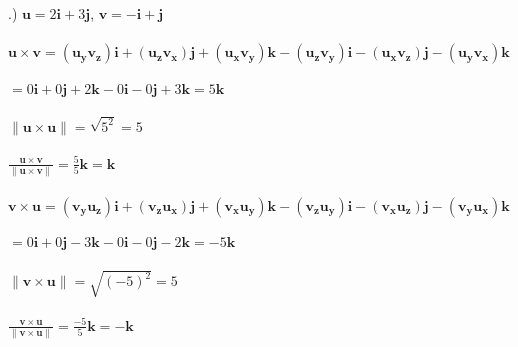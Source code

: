 \documentclass[12pt]{article}
\begin{document}
.) $\mathbf{u} = 2\mathbf{i} + 3\mathbf{j}$, \hspace{10pt} $\mathbf{v} = -\mathbf{i} + \mathbf{j}$\\\\
$\mathbf{u \times v } = (\mathbf{u_{y}v_{z}})\mathbf{i} + (\mathbf{u_{z}v_{x}})\mathbf{j} + (\mathbf{u_{x}v_{y}})\mathbf{k} -(\mathbf{u_{z}v_{y}})\mathbf{i} - (\mathbf{u_{x}v_{z}})\mathbf{j}-(\mathbf{u_{y}v_{x}})\mathbf{k}$\\\\
$=0\mathbf{i} + 0\mathbf{j} + 2\mathbf{k} - 0\mathbf{i} -0\mathbf{j} + 3\mathbf{k} = 5\mathbf{k}$\\\\
$\| \mathbf{u \times u} \| = \sqrt{5^{2}} = 5$\\\\
$\frac{\mathbf{u \times v}}{\| \mathbf{u \times v} \|} = \frac{5}{5}\mathbf{k} = \mathbf{k}$\\\\

\noindent$\mathbf{v \times u } = (\mathbf{v_{y}u_{z}})\mathbf{i} + (\mathbf{v_{z}u_{x}})\mathbf{j} + (\mathbf{v_{x}u_{y}})\mathbf{k} -(\mathbf{v_{z}u_{y}})\mathbf{i} - (\mathbf{v_{x}u_{z}})\mathbf{j}-(\mathbf{v_{y}u_{x}})\mathbf{k}$\\\\
$=0\mathbf{i} + 0\mathbf{j} - 3\mathbf{k} - 0\mathbf{i} -0\mathbf{j} -2\mathbf{k} = -5\mathbf{k}$\\\\
$\| \mathbf{v \times u} \| = \sqrt{(-5)^{2}} = 5$\\\\
$\frac{\mathbf{v \times u}}{\| \mathbf{v \times u} \|} = \frac{-5}{5}\mathbf{k} = -\mathbf{k}$\\\\
\end{document}
